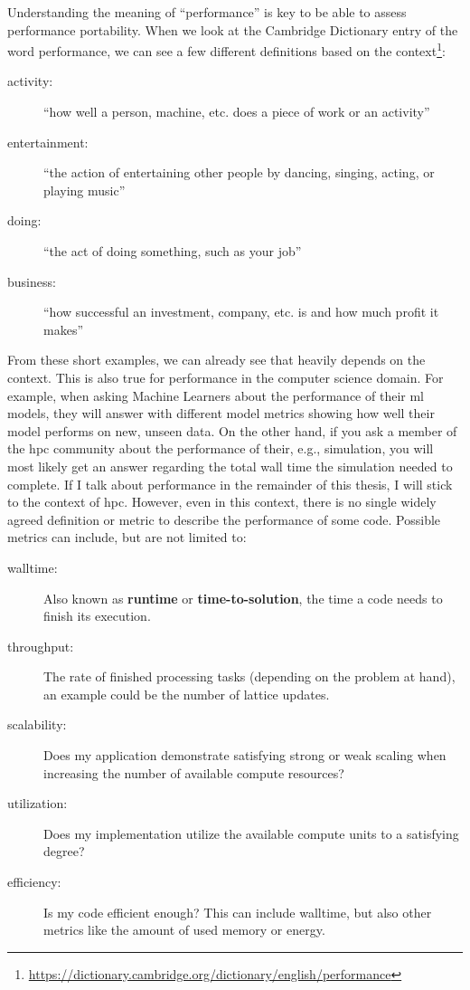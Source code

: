 Understanding the meaning of \enquote{performance} is key to be able to assess performance portability. 
When we look at the Cambridge Dictionary entry of the word performance, we can see a few different definitions based on the context\footnote{\url{https://dictionary.cambridge.org/dictionary/english/performance}}:
\begin{description}
    \item[activity:] \enquote{how well a person, machine, etc. does a piece of work or an activity}
    \item[entertainment:] \enquote{the action of entertaining other people by dancing, singing, acting, or playing music}
    \item[doing:] \enquote{the act of doing something, such as your job}
    \item[business:] \enquote{how successful an investment, company, etc. is and how much profit it makes}
\end{description}
From these short examples, we can already see that  heavily depends on the context. 
This is also true for performance in the computer science domain. 
For example, when asking Machine Learners about the performance of their \gls{ml} models, they will answer with different model metrics showing how well their model performs on new, unseen data. 
On the other hand, if you ask a member of the \gls{hpc} community about the performance of their, e.g., simulation, you will most likely get an answer regarding the total wall time the simulation needed to complete. 
If I talk about performance in the remainder of this thesis, I will stick to the context of \gls{hpc}. 
However, even in this context, there is no single widely agreed definition or metric to describe the performance of some code. 
Possible metrics can include, but are not limited to:
\begin{description}
    \item[walltime:] Also known as \textbf{runtime} or \textbf{time-to-solution}, the time a code needs to finish its execution.
    \item[throughput:] The rate of finished processing tasks (depending on the problem at hand), an example could be the number of lattice updates.
    \item[scalability:] Does my application demonstrate satisfying strong or weak scaling when increasing the number of available compute resources?
    \item[utilization:] Does my implementation utilize the available compute units to a satisfying degree?
    \item[efficiency:] Is my code efficient enough? This can include walltime, but also other metrics like the amount of used memory or energy.
\end{description}

